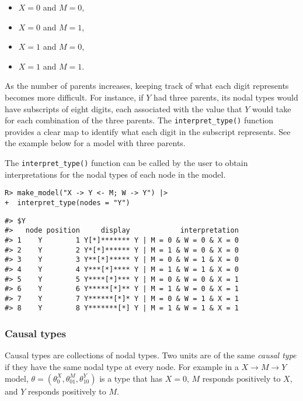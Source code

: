 \documentclass[
  11pt,
  article]{jss}
\providecommand{\tightlist}{%
  \setlength{\itemsep}{0pt}\setlength{\parskip}{0pt}}\usepackage{longtable,booktabs,array}
\begin{document}
\begin{itemize}
\tightlist
\item
  \(X = 0\) and \(M = 0\),
\item
  \(X = 0\) and \(M = 1\),
\item
  \(X = 1\) and \(M = 0\),
\item
  \(X = 1\) and \(M = 1\).
\end{itemize}

As the number of parents increases, keeping track of what each digit
represents becomes more difficult. For instance, if \(Y\) had three
parents, its nodal types would have subscripts of eight digits, each
associated with the value that \(Y\) would take for each combination of
the three parents. The \texttt{interpret\_type()} function provides a
clear map to identify what each digit in the subscript represents. See
the example below for a model with three parents.

The \texttt{interpret\_type()} function can be called by the user to
obtain interpretations for the nodal types of each node in the model.

\begin{verbatim}
R> make_model("X -> Y <- M; W -> Y") |> 
+  interpret_type(nodes = "Y")
\end{verbatim}

\begin{verbatim}
#> $Y
#>   node position     display            interpretation
#> 1    Y        1 Y[*]******* Y | M = 0 & W = 0 & X = 0
#> 2    Y        2 Y*[*]****** Y | M = 1 & W = 0 & X = 0
#> 3    Y        3 Y**[*]***** Y | M = 0 & W = 1 & X = 0
#> 4    Y        4 Y***[*]**** Y | M = 1 & W = 1 & X = 0
#> 5    Y        5 Y****[*]*** Y | M = 0 & W = 0 & X = 1
#> 6    Y        6 Y*****[*]** Y | M = 1 & W = 0 & X = 1
#> 7    Y        7 Y******[*]* Y | M = 0 & W = 1 & X = 1
#> 8    Y        8 Y*******[*] Y | M = 1 & W = 1 & X = 1
\end{verbatim}

\hypertarget{sec-causal-types}{%
\subsubsection{Causal types}\label{sec-causal-types}}

Causal types are collections of nodal types. Two units are of the same
\emph{causal type} if they have the same nodal type at every node. For
example in a \(X \rightarrow M \rightarrow Y\) model,
\(\theta = (\theta^X_0, \theta^M_{01}, \theta^Y_{10})\) is a type that
has \(X=0\), \(M\) responds positively to \(X\), and \(Y\) responds
positively to \(M\).
\end{document}
